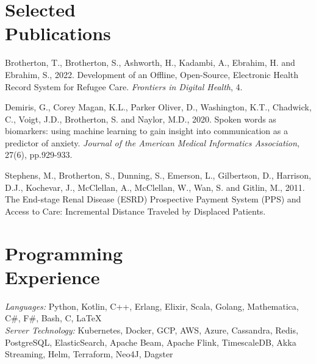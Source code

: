 \documentclass[margin,line]{resume}
\begin{document}
\begin{resume}
    \section{\mysidestyle Selected\\Publications}
    Brotherton, T., Brotherton, S., Ashworth, H., Kadambi, A., Ebrahim, H. and Ebrahim, S., 2022. Development of an Offline, Open-Source, Electronic Health Record System for Refugee Care. \emph{Frontiers in Digital Health}, 4.

    Demiris, G., Corey Magan, K.L., Parker Oliver, D., Washington, K.T., Chadwick, C., Voigt, J.D., Brotherton, S. and Naylor, M.D., 2020. Spoken words as biomarkers: using machine learning to gain insight into communication as a predictor of anxiety. \emph{Journal of the American Medical Informatics Association}, 27(6), pp.929-933.

    Stephens, M., Brotherton, S., Dunning, S., Emerson, L., Gilbertson, D., Harrison, D.J., Kochevar, J., McClellan, A., McClellan, W., Wan, S. and Gitlin, M., 2011. The End-stage Renal Disease (ESRD) Prospective Payment System (PPS) and Access to Care: Incremental Distance Traveled by Displaced Patients.

\section{\mysidestyle Programming\\Experience}

\emph{Languages:} Python, Kotlin, C++, Erlang, Elixir, Scala, Golang, Mathematica,  C\#, F\#,
Bash, C, \LaTeX \\
\emph{Server Technology:} Kubernetes, Docker, GCP, AWS, Azure, Cassandra, Redis,
PostgreSQL, ElasticSearch, Apache Beam, Apache Flink, TimescaleDB, Akka Streaming,
Helm, Terraform, Neo4J, Dagster

\end{resume}
\end{document}
